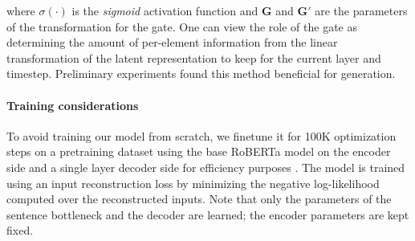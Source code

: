 \noindent where $\sigma(\cdot)$ is the \textit{sigmoid} activation function and $\mathbf{G}$ and $\mathbf{G}'$
are the parameters of the transformation for the gate. %
One can view the role of the gate as determining the amount of per-element information from the linear transformation of the latent representation to keep for the current layer and timestep. Preliminary experiments found this method beneficial for generation.

\paragraph{Training considerations} To avoid training our model from scratch, we finetune it for 100K optimization  steps on a pretraining dataset using the base RoBERTa model \cite{liu2019RoBERTa} on the encoder side and a single layer 
decoder side for efficiency purposes \citep{kasai2021deep}. The model is trained using an input reconstruction loss by minimizing the negative log-likelihood computed over the reconstructed inputs. Note that only the parameters of the sentence bottleneck and the decoder are learned; the encoder parameters are kept fixed.


